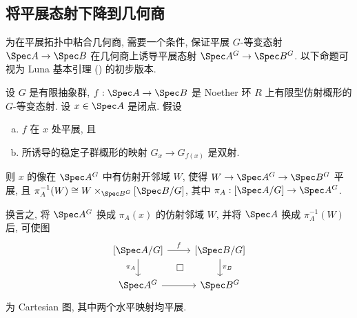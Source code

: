 \subsection{将平展态射下降到几何商}\label{src:5.4.1-subsection}
为在平展拓扑中粘合几何商, 需要一个条件, 保证平展 $G$-等变态射 $\Spec A\to\Spec B$ 在几何商上诱导平展态射 $\Spec A^G\to\Spec B^G$. 以下命题可视为 Luna 基本引理 () 的初步版本.
\begin{proposition}\label{src:5.4.1}
设 $G$ 是有限抽象群, $f:\Spec A\to\Spec B$ 是 Noether 环 $R$ 上有限型仿射概形的 $G$-等变态射. 设 $x\in\Spec A$ 是闭点. 假设
\begin{enumerate}[(a)]
\item $f$ 在 $x$ 处平展, 且
\item 所诱导的稳定子群概形的映射 $G_x\to G_{f(x)}$ 是双射.
\end{enumerate}
则 $x$ 的像在 $\Spec A^G$ 中有仿射开邻域 $W$, 使得 $W\to\Spec A^G\to\Spec B^G$ 平展, 且 $\pi_A^{-1}(W)\cong W\times_{\Spec B^G}[\Spec B/G]$, 其中 $\pi_A:[\Spec A/G]\to\Spec A^G$.
\end{proposition}
\begin{remark}\label{src:5.4.2}
换言之, 将 $\Spec A^G$ 换成 $\pi_A(x)$ 的仿射邻域 $W$, 并将 $\Spec A$ 换成 $\pi_A^{-1}(W)$ 后, 可使图
\begin{equation}\label{src:5.4.3}
\begin{tikzcd}
{[\Spec A/G]}\arrow[r,"f"]\arrow[d,"\pi_A"']&{[\Spec B/G]}\arrow[d,"\pi_B"]\\
\Spec A^G\arrow[r]\arrow[ur,phantom,"\square" description]&\Spec B^G
\end{tikzcd}
\end{equation}
为 Cartesian 图, 其中两个水平映射均平展.
\end{remark}
